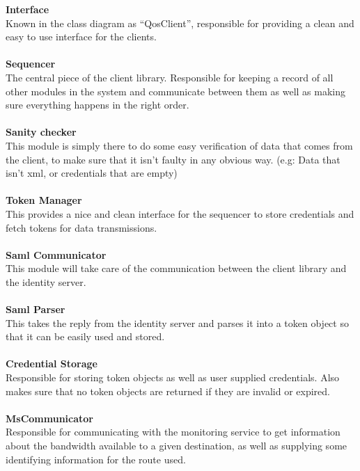 		\textbf{Interface} \\
Known in the class diagram as “QosClient”, responsible for providing a clean and easy to use interface for the clients.
\\\\
		\textbf{Sequencer} \\
The central piece of the client library. Responsible for keeping a record of all other modules in the system and communicate between them as well as making sure everything happens in the right order.
\\\\
		\textbf{Sanity checker} \\
This module is simply there to do some easy verification of data that comes from the client, to make sure that it isn’t faulty in any obvious way. (e.g: Data that isn’t xml, or credentials that are empty)
\\\\
		\textbf{Token Manager} \\
This provides a nice and clean interface for the sequencer to store credentials and fetch tokens for data transmissions.
\\\\
		\textbf{Saml Communicator} \\
This module will take care of the communication between the client library and the identity server.
\\\\
		\textbf{Saml Parser} \\
This takes the reply from the identity server and parses it into a token object so that it can be easily used and stored.
\\\\
		\textbf{Credential Storage} \\
Responsible for storing token objects as well as user supplied credentials. Also makes sure that no token objects are returned if they are invalid or expired.
\\\\
		\textbf{MsCommunicator} \\
Responsible for communicating with the monitoring service to get information about the bandwidth available to a given destination, as well as supplying some identifying information for the route used.

